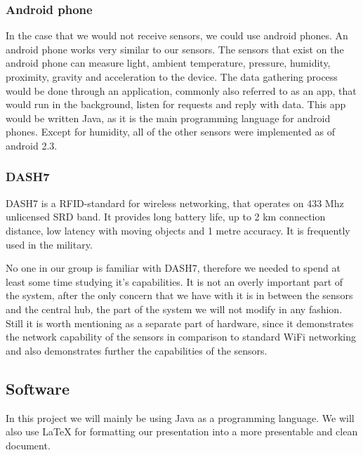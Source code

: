 \documentclass[../document.tex]{subfiles}
\begin{document}
\subsubsection*{Android phone}
In the case that we would not receive sensors, we could use android phones. An android phone works very similar to our sensors. The sensors that exist on the android phone can measure light, ambient temperature, pressure, humidity, proximity, gravity and acceleration to the device. The data gathering process would be done through an application, commonly also referred to as an app, that would run in the background, listen for requests and reply with data. This app would be written Java, as it is the main programming language for android phones. Except for humidity, all of the other sensors were implemented as of android 2.3.

\subsubsection*{DASH7}
DASH7 is a RFID-standard for wireless networking, that operates on 433 Mhz unlicensed SRD band. It provides long battery life, up to 2 km connection distance, low latency with moving objects and 1 metre accuracy. It is frequently used in the military.

No one in our group is familiar with DASH7, therefore we needed to spend at least some time studying it’s capabilities. It is not an overly important part of the system, after the only concern that we have with it is in between the sensors and the central hub, the part of the system we will not modify in any fashion. Still it is worth mentioning as a separate part of hardware, since it demonstrates the network capability of the sensors in comparison to standard WiFi networking and also demonstrates further the capabilities of the sensors.

\subsection*{Software}

In this project we will mainly be using Java as a programming language. We will also use LaTeX for formatting our presentation into a more presentable and clean document.
\end{document}
